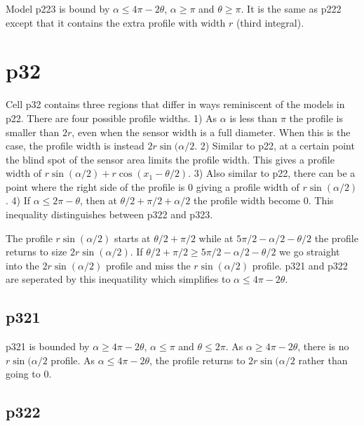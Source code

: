 Model p223 is bound by $\alpha \le 4\pi - 2\theta$, $\alpha \ge \pi$ and $\theta \ge \pi$. It is the same as p222 except that it contains the extra profile with width $r$ (third integral).



\section{p32} \label{p32}

Cell p32 contains three regions that differ in ways reminiscent of the models in p22. There are four possible profile widths. 1) As $\alpha$ is less than $\pi$ the profile is smaller than $2r$, even when the sensor width is a full diameter. When this is the case, the profile width is instead $2r\sin(\alpha/2$. 2) Similar to p22, at a certain point the blind spot of the sensor area limits the profile width. This gives a profile width of $r\sin(\alpha/2) + r\cos(x_1 - \theta/2)$. 3) Also similar to p22, there can be a point where the right side of the profile is 0 giving a profile width of $r\sin(\alpha/2)$. 4) If $\alpha \le 2\pi - \theta$, then at $\theta/2 + \pi/2 + \alpha/2 $ the profile width become 0. This inequality distinguishes between p322 and p323. 

The profile $r\sin(\alpha/2)$ starts at $\theta/2 + \pi/2$ while at $5\pi/2 - \alpha/2 - \theta/2$ the profile returns to size $2r\sin(\alpha/2)$. If $\theta/2 + \pi/2 \ge 5\pi/2 - \alpha/2 - \theta/2$ we go straight into the  $2r\sin(\alpha/2)$ profile and miss the $r\sin(\alpha/2)$ profile.  p321 and p322 are seperated by this inequatility which simplifies to $\alpha \le 4\pi - 2\theta$. 

\subsection{p321} \label{p321}

p321 is bounded by $\alpha \ge 4\pi - 2\theta$, $\alpha \le \pi$ and $\theta \le 2\pi$. As $\alpha \ge 4\pi - 2\theta$, there is no $r\sin(\alpha/2$ profile. As $\alpha \le 4\pi - 2\theta$, the profile returns to $2r\sin(\alpha/2$ rather than going to 0.



\subsection{p322} \label{p322}


